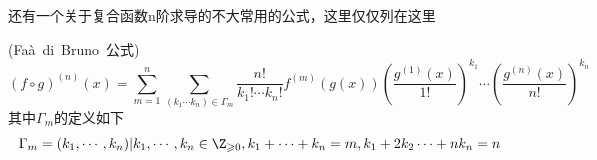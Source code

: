 还有一个关于复合函数n阶求导的不大常用的公式，这里仅仅列在这里
\begin{proposition}(Fa\`a~di~Bruno~公式)
	\[(f\circ g)^{(n)}(x)=\sum_{m=1}^{n}\sum_{(k_1\cdots k_n)\in\Gamma_m}\frac{n!}{k_1!\cdots k_n!}f^{(m)}(g(x))(\frac{g^{(1)}(x)}{1!})^{k_1}\cdots (\frac{g^{(n)}(x)}{n!})^{k_n}\]
	其中$\Gamma_m$的定义如下
	\[\Gamma_m ={(k_1,\cdots,k_n)|k_1,\cdots,k_n\in \Z_{\geqslant 0},k_1 +\cdots+k_n=m,k_1 +2k_2\cdots+nk_n=n}\]
\end{proposition}
\newpage
